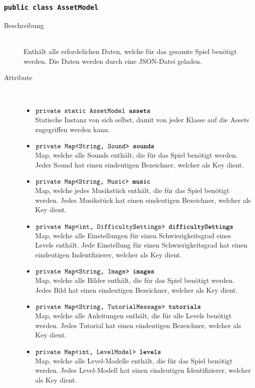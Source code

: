 \subsubsection{\normalfont \texttt{public class \textbf{AssetModel}}}

\begin{description}
\item[Beschreibung] \hfill \\ Enthält alle erfordelichen Daten, welche für das gesamte Spiel benötigt werden. Die Daten werden durch eine JSON-Datei geladen.
\item[Attribute] \hfill \\
	\vspace{-.8cm}
	\begin{itemize}	
		\item $\texttt{private static AssetModel \textbf{assets}}$ \\ Statische Instanz von sich selbst, damit von jeder Klasse auf die Assets zugegriffen werden kann.
		\item $\texttt{private Map<String, Sound> \textbf{sounds}}$ \\ Map, welche alle Sounds enthält, die für das Spiel benötigt werden. Jeder Sound hat einen eindeutigen Bezeichner, welcher als Key dient.
		\item $\texttt{private Map<String, Music> \textbf{music}}$ \\ Map, welche jedes Musikstück enthält, die für das Spiel benötigt werden. Jedes Musikstück hat einen eindeutigen Bezeichner, welcher als Key dient.
		\item $\texttt{private Map<int, DifficultySettings> \textbf{difficultySettings}}$ \\ Map, welche alle Einstellungen für einen Schwierigkeitsgrad eines Levels enthält. Jede Einstellung für einen Schwierigkeitsgrad hat einen eindeutigen Indentfizierer, welcher als Key dient.
		\item $\texttt{private Map<String, Image> \textbf{images}}$ \\ Map, welche alle Bilder enthält, die für das Spiel benötigt werden. Jedes Bild hat einen eindeutigen Bezeichner, welcher als Key dient.
		\item $\texttt{private Map<String, TutorialMessage> \textbf{tutorials}}$ \\ Map, welche alle Anleitungen enthält, die für alle Levels benötigt werden. Jedes Tutorial hat einen eindeutigen Bezeichner, welcher als Key dient.
		\item $\texttt{private Map<int, LevelModel> \textbf{levels}}$ \\ Map, welche alle Level-Modelle enthält, die für das Spiel benötigt werden. Jedes Level-Modell hat einen eindeutigen Identifizierer, welcher als Key dient.


\end{itemize}
\end{description}
